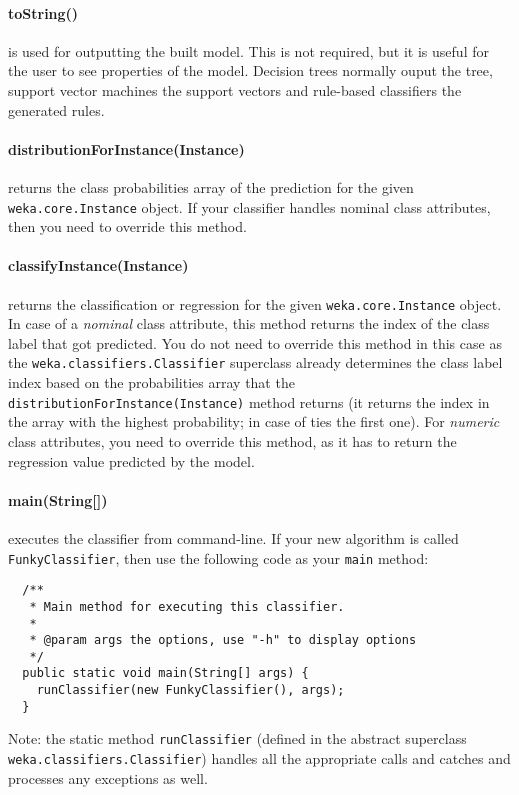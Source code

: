 \paragraph{toString()} is used for outputting the built model. This is not
required, but it is useful for the user to see properties of the model. Decision
trees normally ouput the tree, support vector machines the support vectors and
rule-based classifiers the generated rules.

\paragraph{distributionForInstance(Instance)} returns the class probabilities
array of the prediction for the given \texttt{weka.core.Instance} object. If
your classifier handles nominal class attributes, then you need to override
this method.

\clearpage

\paragraph{classifyInstance(Instance)} returns the classification or regression
for the given \texttt{weka.core.Instance} object. In case of a \textit{nominal}
class attribute, this method returns the index of the class label that got
predicted. You do not need to override this method in this case as the
\texttt{weka.classifiers.Classifier} superclass already determines the class
label index based on the probabilities array that the
\texttt{distributionForInstance(Instance)} method returns (it returns the index
in the array with the highest probability; in case of ties the first one). For
\textit{numeric} class attributes, you need to override this method, as it
has to return the regression value predicted by the model.

\paragraph{main(String[])} executes the classifier from command-line. If your
new algorithm is called \texttt{FunkyClassifier}, then use the following code
as your \texttt{main} method:
\begin{verbatim}
  /**
   * Main method for executing this classifier.
   *
   * @param args the options, use "-h" to display options
   */
  public static void main(String[] args) {
    runClassifier(new FunkyClassifier(), args);
  }
\end{verbatim}
Note: the static method \texttt{runClassifier} (defined in the abstract
superclass \texttt{weka.classifiers.Classifier}) handles all the appropriate
calls and catches and processes any exceptions as well.

